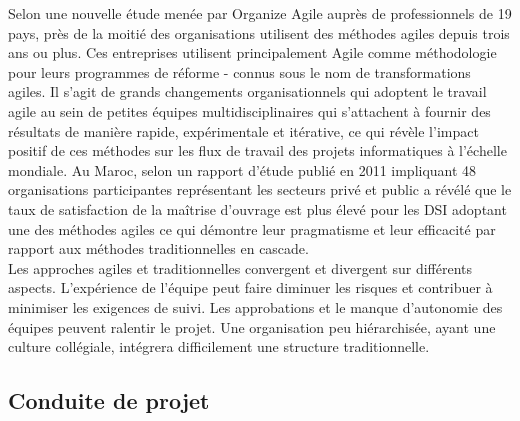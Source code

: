 Selon une nouvelle étude menée par Organize Agile\cite{organize_agile} auprès de professionnels de 19 pays, près de la moitié des organisations utilisent des méthodes agiles depuis trois ans ou plus. Ces entreprises utilisent principalement Agile comme méthodologie pour leurs programmes de réforme - connus sous le nom de transformations agiles. Il s'agit de grands changements organisationnels qui adoptent le travail agile au sein de petites équipes multidisciplinaires qui s'attachent à fournir des résultats de manière rapide, expérimentale et itérative, ce qui révèle l'impact positif de ces méthodes sur les flux de travail des projets informatiques à l'échelle mondiale. Au Maroc, selon un rapport d'étude publié en 2011 impliquant 48 organisations participantes représentant les secteurs privé et public a révélé que le taux de satisfaction de la maîtrise d'ouvrage est plus élevé pour les DSI adoptant une des méthodes agiles ce qui démontre leur pragmatisme et leur efficacité par rapport aux méthodes traditionnelles en cascade\cite{badr_2011}.\\

Les approches agiles et traditionnelles convergent et divergent sur différents aspects. L’expérience de l’équipe peut faire diminuer les risques et contribuer à minimiser les exigences de suivi. Les approbations et le manque d’autonomie des équipes peuvent ralentir le projet. Une organisation peu hiérarchisée, ayant une culture collégiale, intégrera difficilement une structure traditionnelle.\\
\subsection{Conduite de projet}

